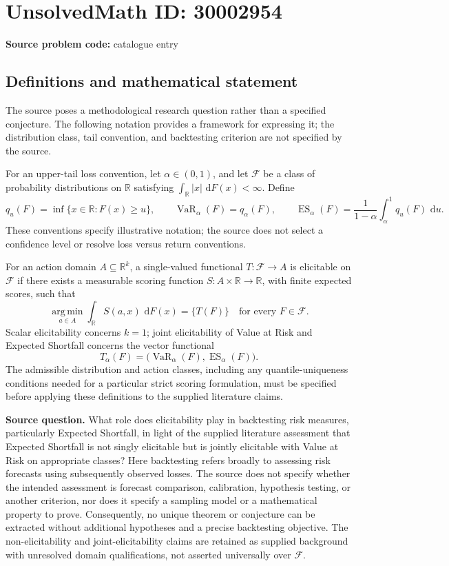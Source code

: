 \documentclass[11pt]{article}
\newcommand{\R}{\mathbb{R}}
\newcommand{\dd}{\,\mathrm{d}}
\begin{document}
\section*{UnsolvedMath ID: 30002954}
\textbf{Source problem code:} catalogue entry
\subsection{Definitions and mathematical statement}
The source poses a methodological research question rather than a specified conjecture. The following notation provides a framework for expressing it; the distribution class, tail convention, and backtesting criterion are not specified by the source.

For an upper-tail loss convention, let \(\alpha\in(0,1)\), and let \(\mathcal F\) be a class of probability distributions on \(\R\) satisfying \(\int_{\R}|x|\,\dd F(x)<\infty\). Define
\[
q_u(F)=\inf\{x\in\R:F(x)\geq u\},\qquad
\operatorname{VaR}_{\alpha}(F)=q_{\alpha}(F),\qquad
\operatorname{ES}_{\alpha}(F)=\frac{1}{1-\alpha}\int_{\alpha}^{1}q_u(F)\,\dd u.
\]
These conventions specify illustrative notation; the source does not select a confidence level or resolve loss versus return conventions.

For an action domain \(A\subseteq\R^k\), a single-valued functional \(T:\mathcal F\to A\) is elicitable on \(\mathcal F\) if there exists a measurable scoring function \(S:A\times\R\to\R\), with finite expected scores, such that
\[
\operatorname*{arg\,min}_{a\in A}\int_{\R}S(a,x)\,\dd F(x)=\{T(F)\}
\quad\text{for every }F\in\mathcal F.
\]
Scalar elicitability concerns \(k=1\); joint elicitability of Value at Risk and Expected Shortfall concerns the vector functional
\[
T_{\alpha}(F)=\bigl(\operatorname{VaR}_{\alpha}(F),\operatorname{ES}_{\alpha}(F)\bigr).
\]
The admissible distribution and action classes, including any quantile-uniqueness conditions needed for a particular strict scoring formulation, must be specified before applying these definitions to the supplied literature claims.

\textbf{Source question.} What role does elicitability play in backtesting risk measures, particularly Expected Shortfall, in light of the supplied literature assessment that Expected Shortfall is not singly elicitable but is jointly elicitable with Value at Risk on appropriate classes? Here backtesting refers broadly to assessing risk forecasts using subsequently observed losses. The source does not specify whether the intended assessment is forecast comparison, calibration, hypothesis testing, or another criterion, nor does it specify a sampling model or a mathematical property to prove. Consequently, no unique theorem or conjecture can be extracted without additional hypotheses and a precise backtesting objective. The non-elicitability and joint-elicitability claims are retained as supplied background with unresolved domain qualifications, not asserted universally over \(\mathcal F\).
\end{document}
